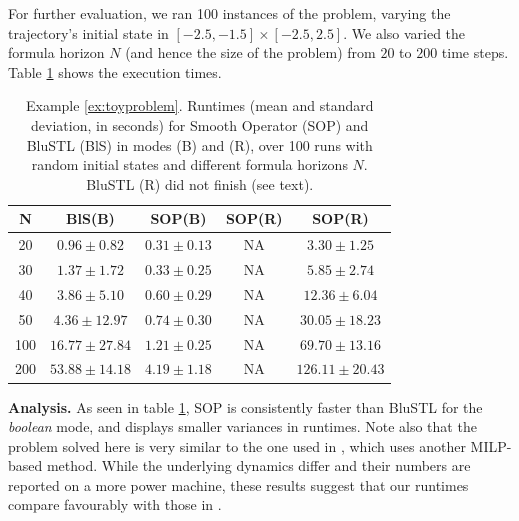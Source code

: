 \begin{exmp}
For further evaluation, we ran 100 instances of the problem, varying the trajectory's initial state in $[-2.5,-1.5] \times [-2.5,2.5]$. 
We also varied the formula horizon $N$ (and hence the size of the problem) from $20$ to $200$ time steps. 
Table \ref{tbl:time_performance_toy} shows the execution times. 



\begin{table}[tb]
\small
\begin{center}
\caption{{\small Example \ref{ex:toyproblem}. Runtimes (mean and standard deviation, in seconds) for Smooth Operator (SOP) and BluSTL (BlS) in modes (B) and (R), over 100 runs with random initial states and different formula horizons $N$. BluSTL (R) did not finish (see text).}}
\vspace{-5pt}
\label{tbl:time_performance_toy}
\begin{tabular} {|c|c|c|c|c|}
	\hline
	N & BlS(B) & SOP(B) & SOP(R) & SOP(R) \\ \hline
	20 & $0.96 \pm 0.82$ &  $\mathbf{0.31 \pm 0.13}$  & NA & $3.30 \pm 1.25$ \\ \hline
	30 & $1.37 \pm 1.72$ &  $\mathbf{0.33 \pm 0.25}$  & NA & $5.85 \pm 2.74$\\ \hline
	40 & $3.86 \pm 5.10$ &  $\mathbf{0.60 \pm 0.29}$  & NA & $12.36 \pm 6.04$\\ \hline
	50 & $4.36 \pm 12.97$&  $\mathbf{0.74 \pm 0.30}$ & NA & $30.05 \pm 18.23$\\ \hline
	100& $16.77 \pm 27.84$ & $\mathbf{1.21 \pm 0.25}$ & NA & $69.70 \pm 13.16$ \\ \hline
	200& $53.88 \pm 14.18$& $\mathbf{4.19 \pm 1.18}$ & NA & $126.11 \pm 20.43$ \\ \hline
\end{tabular}	
\end{center}
\end{table}

\textbf{Analysis.}
As seen in table \ref{tbl:time_performance_toy}, SOP is consistently faster than BluSTL for the \textit{boolean} mode, and displays smaller variances in runtimes. 
Note also that the problem solved here is very similar to the one used in \cite{Saha_acc16}, which uses another MILP-based method. 
While the underlying dynamics differ and their numbers are reported on a more power machine, these results suggest that our runtimes compare favourably with those in \cite{Saha_acc16}.


\end{exmp}
